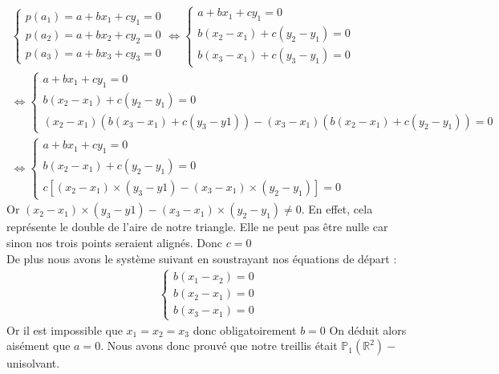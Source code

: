 \begin{align*}
\left\{\begin{matrix}
p\left(a_1\right)=a+bx_1+cy_1=0\\
p\left(a_2\right)=a+bx_2+cy_2=0\\
p\left(a_3\right)=a+bx_3+cy_3=0
\end{matrix}\right.\Leftrightarrow\left\{\begin{matrix}
a+bx_1+cy_1=0\\
b(x_2-x_1)+c(y_2-y_1)=0\\
b(x_3-x_1)+c(y_3-y_1)=0
\end{matrix}\right.\\
\Leftrightarrow\left\{\begin{matrix}
a+bx_1+cy_1=0\\
b(x_2-x_1)+c(y_2-y_1)=0\\
(x_2-x_1)\left(b(x_3-x_1)+c(y_3-y1)\right)-(x_3-x_1)\left(b(x_2-x_1)+c(y_2-y_1)\right)=0
\end{matrix}\right.\\
\Leftrightarrow\left\{\begin{matrix}
a+bx_1+cy_1=0\\
b(x_2-x_1)+c(y_2-y_1)=0\\
c\left[(x_2-x_1)\times (y_3-y1)-(x_3-x_1)\times(y_2-y_1)\right]=0
\end{matrix}\right.
\end{align*}
Or $(x_2-x_1)\times (y_3-y1)-(x_3-x_1)\times(y_2-y_1) \neq 0$. En effet, cela représente le double de l'aire de notre triangle. Elle ne peut pas \^etre nulle car sinon nos trois points seraient alignés. Donc $c=0$\\
De plus nous avons le système suivant en soustrayant nos équations de départ :
\begin{align*}
\left\{\begin{matrix}
b(x_1-x_2)=0\\
b(x_2-x_1)=0\\
b(x_3-x_1)=0
\end{matrix}\right.
\end{align*}
Or il est impossible que $x_1=x_2=x_3$ donc obligatoirement $b=0$ On déduit alors aisément que $a=0$. Nous avons donc prouvé que notre treillis était $\mathbb{P}_1\left(\mathbb{R}^2\right)-$unisolvant.